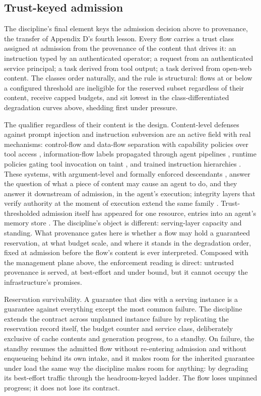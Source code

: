 \subsection{Trust-keyed admission}

The discipline's final element keys the admission decision above to provenance, the transfer of Appendix D's fourth lesson. Every flow
carries a trust class assigned at admission from the provenance of the
content that drives it: an instruction typed by an authenticated
operator; a request from an authenticated service principal; a task
derived from tool output; a task derived from open-web content. The
classes order naturally, and the rule is structural: flows at or below a
configured threshold are ineligible for the reserved subset regardless of
their content, receive capped budgets, and sit lowest in the class-differentiated degradation curves above, shedding first
under pressure.

The qualifier regardless of their content is the design. Content-level
defenses against prompt injection and instruction subversion are an
active field with real mechanisms: control-flow and data-flow separation
with capability policies over tool access \citep{camel2025}, information-flow
labels propagated through agent pipelines \citep{fides2025}, runtime policies
gating tool invocation on taint \citep{rtbas2025}, and trained instruction
hierarchies \citep{wallace2024}. These systems, with argument-level and
formally enforced descendants \citep{pact2026,provgates2026}, answer the
question of what a piece of content may cause an agent to do, and they
answer it downstream of admission, in the agent's execution; integrity
layers that verify authority at the moment of execution extend the same
family \citep{cxi2026}. Trust-thresholded admission itself has appeared for one
resource, entries into an agent's memory store \citep{memcurate2026}. The
discipline's object is different: serving-layer capacity and standing.
What provenance gates here is whether a flow may hold a guaranteed
reservation, at what budget scale, and where it stands in the degradation
order, fixed at admission before the flow's content is ever interpreted.
Composed with the management plane above, the enforcement reading is direct: untrusted
provenance is served, at best-effort and under bound, but it cannot
occupy the infrastructure's promises.

Reservation survivability. A guarantee that dies with a serving instance
is a guarantee against everything except the most common failure. The
discipline extends the contract across unplanned instance failure by
replicating the reservation record itself, the budget counter and service
class, deliberately exclusive of cache contents and generation progress,
to a standby. On failure, the standby resumes the admitted flow without
re-entering admission and without enqueueing behind its own intake, and
it makes room for the inherited guarantee under load the same way the
discipline makes room for anything: by degrading its best-effort traffic
through the headroom-keyed ladder. The flow loses unpinned progress; it
does not lose its contract.
